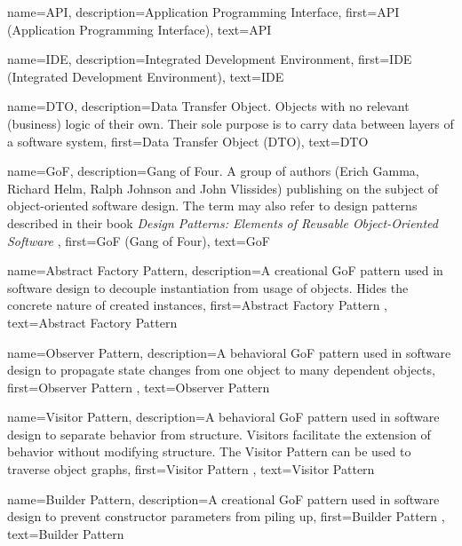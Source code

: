 {
    name=API,
    description={Application Programming Interface},
    first={API (Application Programming Interface)},
    text={API}
}

{
    name=IDE,
    description={Integrated Development Environment},
    first={IDE (Integrated Development Environment)},
    text={IDE}
}

{
    name=DTO,
    description={Data Transfer Object. Objects with no relevant (business) logic of their own. Their sole purpose is to carry data between layers of a software system},
    first={Data Transfer Object (DTO)},
    text={DTO}
}

{
    name=GoF,
    description={Gang of Four. A group of authors (Erich Gamma, Richard Helm, Ralph Johnson and John Vlissides) publishing on the subject of object-oriented software design. The term may also refer to design patterns described in their book \textit{Design Patterns: Elements of Reusable Object-Oriented Software} \cite{Gamma:1995:DPE:186897}},
    first={GoF (Gang of Four)},
    text={GoF}
}

{
    name={Abstract Factory Pattern},
    description={A creational \gls{GoF} pattern used in software design to decouple instantiation from usage of objects. Hides the concrete nature of created instances},
    first={Abstract Factory Pattern \cite{Gamma:1995:DPE:186897}},
    text={Abstract Factory Pattern}
}

{
    name={Observer Pattern},
    description={A behavioral \gls{GoF} pattern used in software design to propagate state changes from one object to many dependent objects},
    first={Observer Pattern \cite{Gamma:1995:DPE:186897}},
    text={Observer Pattern}
}

{
    name={Visitor Pattern},
    description={A behavioral \gls{GoF} pattern used in software design to separate behavior from structure. Visitors facilitate the extension of behavior without modifying structure. The Visitor Pattern can be used to traverse object graphs},
    first={Visitor Pattern \cite{Gamma:1995:DPE:186897}},
    text={Visitor Pattern}
}

{
    name={Builder Pattern},
    description={A creational \gls{GoF} pattern used in software design to prevent constructor parameters from piling up},
    first={Builder Pattern \cite{Gamma:1995:DPE:186897}},
    text={Builder Pattern}
}


